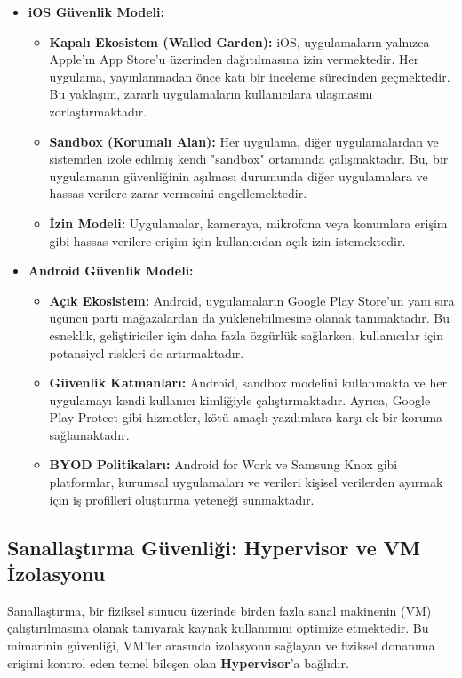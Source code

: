 \begin{itemize}
    \item \textbf{iOS Güvenlik Modeli:}
    \begin{itemize}
        \item \textbf{Kapalı Ekosistem (Walled Garden):} iOS, uygulamaların yalnızca Apple'ın App Store'u üzerinden dağıtılmasına izin vermektedir. Her uygulama, yayınlanmadan önce katı bir inceleme sürecinden geçmektedir. Bu yaklaşım, zararlı uygulamaların kullanıcılara ulaşmasını zorlaştırmaktadır.
        \item \textbf{Sandbox (Korumalı Alan):} Her uygulama, diğer uygulamalardan ve sistemden izole edilmiş kendi "sandbox" ortamında çalışmaktadır. Bu, bir uygulamanın güvenliğinin aşılması durumunda diğer uygulamalara ve hassas verilere zarar vermesini engellemektedir.
        \item \textbf{İzin Modeli:} Uygulamalar, kameraya, mikrofona veya konumlara erişim gibi hassas verilere erişim için kullanıcıdan açık izin istemektedir.
    \end{itemize}
    \item \textbf{Android Güvenlik Modeli:}
    \begin{itemize}
        \item \textbf{Açık Ekosistem:} Android, uygulamaların Google Play Store'un yanı sıra üçüncü parti mağazalardan da yüklenebilmesine olanak tanımaktadır. Bu esneklik, geliştiriciler için daha fazla özgürlük sağlarken, kullanıcılar için potansiyel riskleri de artırmaktadır.
        \item \textbf{Güvenlik Katmanları:} Android, sandbox modelini kullanmakta ve her uygulamayı kendi kullanıcı kimliğiyle çalıştırmaktadır. Ayrıca, Google Play Protect gibi hizmetler, kötü amaçlı yazılımlara karşı ek bir koruma sağlamaktadır.
        \item \textbf{BYOD Politikaları:} Android for Work ve Samsung Knox gibi platformlar, kurumsal uygulamaları ve verileri kişisel verilerden ayırmak için iş profilleri oluşturma yeteneği sunmaktadır.
    \end{itemize}
\end{itemize}

\subsection{Sanallaştırma Güvenliği: Hypervisor ve VM İzolasyonu}

Sanallaştırma, bir fiziksel sunucu üzerinde birden fazla sanal makinenin (VM) çalıştırılmasına olanak tanıyarak kaynak kullanımını optimize etmektedir. Bu mimarinin güvenliği, VM'ler arasında izolasyonu sağlayan ve fiziksel donanıma erişimi kontrol eden temel bileşen olan \textbf{Hypervisor}'a bağlıdır.

